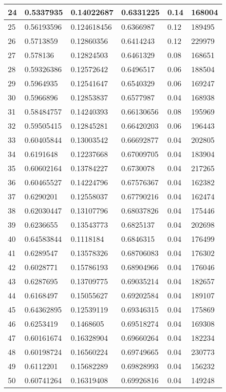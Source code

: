 \begin{longtable}{|l|l|l|l|l|l|}
24 & 0.5337935 & 0.14022687 & 0.6331225 & 0.14 & 168004 \\ \hline 
25 & 0.56193596 & 0.124618456 & 0.6366987 & 0.12 & 189495 \\ \hline 
26 & 0.5713859 & 0.12860356 & 0.6414243 & 0.12 & 229979 \\ \hline 
27 & 0.578136 & 0.12824503 & 0.6461329 & 0.08 & 168651 \\ \hline 
28 & 0.59326386 & 0.12572642 & 0.6496517 & 0.06 & 188504 \\ \hline 
29 & 0.5964935 & 0.12541647 & 0.6540329 & 0.06 & 169247 \\ \hline 
30 & 0.5966896 & 0.12853837 & 0.6577987 & 0.04 & 168938 \\ \hline 
31 & 0.58484757 & 0.14240393 & 0.66130656 & 0.08 & 195969 \\ \hline 
32 & 0.59505415 & 0.12845281 & 0.66420203 & 0.06 & 196443 \\ \hline 
33 & 0.60405844 & 0.13003542 & 0.66692877 & 0.04 & 202805 \\ \hline 
34 & 0.6191648 & 0.12237668 & 0.67009705 & 0.04 & 183904 \\ \hline 
35 & 0.60602164 & 0.13784227 & 0.6730078 & 0.04 & 217265 \\ \hline 
36 & 0.60465527 & 0.14224796 & 0.67576367 & 0.04 & 162382 \\ \hline 
37 & 0.6290201 & 0.12558037 & 0.67790216 & 0.04 & 162474 \\ \hline 
38 & 0.62030447 & 0.13107796 & 0.68037826 & 0.04 & 175446 \\ \hline 
39 & 0.6236655 & 0.13543773 & 0.6825137 & 0.04 & 202698 \\ \hline 
40 & 0.64583844 & 0.1118184 & 0.6846315 & 0.04 & 176499 \\ \hline 
41 & 0.6289547 & 0.13578326 & 0.68706083 & 0.04 & 176302 \\ \hline 
42 & 0.6028771 & 0.15786193 & 0.68904966 & 0.04 & 176046 \\ \hline 
43 & 0.6287695 & 0.13709775 & 0.69035214 & 0.04 & 182657 \\ \hline 
44 & 0.6168497 & 0.15055627 & 0.69202584 & 0.04 & 189107 \\ \hline 
45 & 0.64362895 & 0.12539119 & 0.69346315 & 0.04 & 175869 \\ \hline 
46 & 0.6253419 & 0.1468605 & 0.69518274 & 0.04 & 169308 \\ \hline 
47 & 0.60161674 & 0.16328904 & 0.69660264 & 0.04 & 182234 \\ \hline 
48 & 0.60198724 & 0.16560224 & 0.69749665 & 0.04 & 230773 \\ \hline 
49 & 0.6112201 & 0.15682289 & 0.69828993 & 0.04 & 156232 \\ \hline 
50 & 0.60741264 & 0.16319408 & 0.69926816 & 0.04 & 149248 \\ \hline 
\end{longtable}